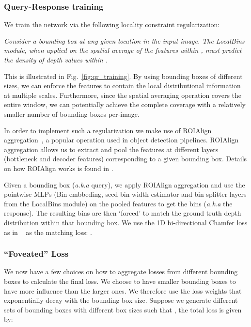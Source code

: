 \documentclass[runningheads]{llncs}
\begin{document}
\subsubsection{Query-Response training}
\label{subsec:qr_training}
We train the network via the following locality constraint regularization:

\textit{Consider a bounding box  at any given location in the input image. The LocalBins module, when applied on the spatial average of the features within , must predict the density of depth values within .}

This is illustrated in Fig.~\ref{fig:qr_training}. By using bounding boxes of different sizes, we can enforce the features to contain the local distributional information at multiple scales. Furthermore, since the spatial averaging operation covers the entire window, we can potentially achieve the complete coverage with a relatively smaller number of bounding boxes per-image.

In order to implement such a regularization we make use of ROIAlign aggregation~\cite{He2017_MaskRCNN}, a popular operation used in object detection pipelines. ROIAlign aggregation allows us to extract and pool the features at different layers (bottleneck and decoder features) corresponding to a given bounding box. Details on how ROIAlign works is found in \cite{He2017_MaskRCNN}. 

Given a bounding box  (\textit{a.k.a} query), we apply ROIAlign aggregation and use the pointwise MLPs (Bin embbeding, seed bin width estimator and bin splitter layers from the LocalBins module) on the pooled features to get the bins  (\textit{a.k.a} the response).
The resulting bins  are then `forced' to match the ground truth depth distribution within that bounding box. We use the 1D bi-directional Chamfer loss as in ~\cite{Bhat2021} as the matching loss: . 


\subsubsection{``Foveated'' Loss}
We now have a few choices on how to aggregate losses from different bounding boxes to calculate the final loss. We choose to have smaller bounding boxes to have more influence than the larger ones. We therefore use the loss weights that exponentially decay with the bounding box size. Suppose we generate  different sets of bounding boxes  with different box sizes such that , the total loss is given by:
\end{document}
